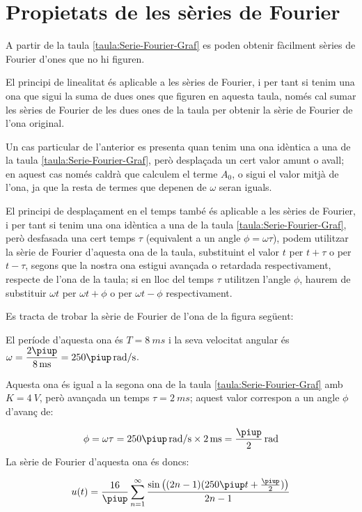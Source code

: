 \section{Propietats de les sèries de Fourier}

A partir de la taula \vref{taula:Serie-Fourier-Graf} es poden obtenir fàcilment sèries de Fourier d'ones que no hi figuren.

El principi de linealitat és aplicable a les sèries de Fourier, i per tant si tenim una ona que sigui la suma de dues ones que figuren en aquesta taula, només  cal sumar les sèries de Fourier de les dues ones de la taula per obtenir la sèrie de Fourier de l'ona original.

Un cas particular de l'anterior es presenta quan tenim una ona  idèntica a una de la taula \ref{taula:Serie-Fourier-Graf}, però desplaçada un cert valor amunt o avall; en aquest cas només caldrà que calculem el terme $A_0$, o sigui el valor mitjà de l'ona, ja que la resta de termes que depenen de $\omega$ seran iguals.

El principi de desplaçament en el temps també és aplicable a les sèries de Fourier, i per tant si tenim una ona idèntica a una de la taula \ref{taula:Serie-Fourier-Graf}, però desfasada una cert temps $\tau$ (equivalent a un angle $\phi = \omega \tau$), podem utilitzar la sèrie de Fourier d'aquesta ona de la taula, substituint el valor $t$ per $t+\tau$ o per $t-\tau$, segons que la nostra ona estigui avançada o retardada respectivament, respecte de l'ona de la taula; si en lloc del temps $\tau$ utilitzen l'angle $\phi$, haurem de substituir  $\omega t$ per $\omega t + \phi$ o per $\omega t - \phi$ respectivament.


\begin{exemple}
    Es tracta de trobar la sèrie de Fourier de l'ona de la figura següent:
    \begin{center}
        
    \end{center}

    El període d'aquesta ona és $T=\SI{8}{ms}$ i la seva velocitat angular és $\omega = \dfrac{2\piup}{\SI{8}{ms}} = 250 \piup\si{\,rad/s}$.

    Aquesta ona és igual a la segona ona de la taula \vref{taula:Serie-Fourier-Graf} amb $K=\SI{4}{V}$, però avançada un temps $\tau=\SI{2}{ms}$; aquest valor correspon a un angle $\phi$ d'avanç de:

    \[
        \phi = \omega \tau = 250\piup\si{\,rad/s} \times \SI{2}{ms} = \frac{\piup}{2}\si{\,rad}
    \]
    La sèrie de Fourier d'aquesta ona és doncs:

    \[
    u(t) = \frac{{16}}{\piup }\sum\limits_{n = 1}^\infty  {\frac{{\sin \big((2n - 1)(250\piup t+ \frac{\piup}{2})\big)}}{{2n - 1}}}
    \]
\end{exemple}


